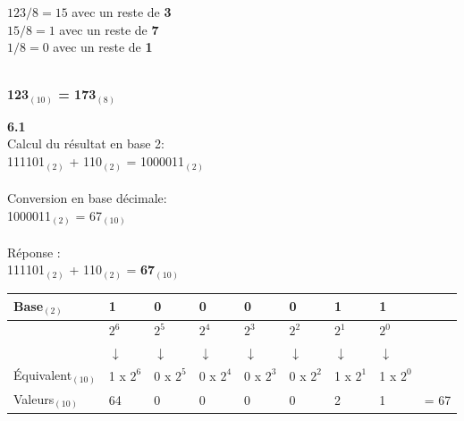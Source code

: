 \begin{Exercice}[20 minutes]
\begin{conseil}
        $123 / 8 = 15$ avec un reste de \textbf{3}\\
        $15 / 8 = 1$ avec un reste de \textbf{7}\\
        $1 / 8 = 0$ avec un reste de \textbf{1}\\\
        
        \textbf{123$_{(10)}$ = 173$_{(8)}$}\\
        
    \end{conseil}
    \begin{solution} \textbf{6.1}\\
        Calcul du résultat en base 2:\\
        111101$_{(2)}$ + 110$_{(2)}$ = 1000011$_{(2)}$\\\\
        Conversion en base décimale:\\
        1000011$_{(2)}$ = 67$_{(10)}$\\\\
        Réponse :\\
        111101$_{(2)}$ + 110$_{(2)}$ = \textbf{67$_{(10)}$}\\
        
        \begin{tabular}{| C{0.15\textwidth} | C{0.07\textwidth} | C{0.07\textwidth} | C{0.07\textwidth} | C{0.07\textwidth} | C{0.07\textwidth} | C{0.07\textwidth} | C{0.07\textwidth} | C{0.06\textwidth} |} 
            \hline
            Base$_{(2)}$ & \textbf{1} & \textbf{0} & \textbf{0} & \textbf{0} & \textbf{0} & \textbf{1} & \textbf{1} & \textbf{}\\ [0.5ex]
            \hline
             & $2^6$ & $2^5$ & $2^4$ & $2^3$ & $2^2$ & $2^1$ & $2^0$ & \\ [0.5ex] 
            \hline
             & $\downarrow$ & $\downarrow$ & $\downarrow$ & $\downarrow$ & $\downarrow$ & $\downarrow$ & $\downarrow$ & \\ [0.5ex] 
            \hline
            Équivalent$_{(10)}$ & 1 x $2^6$ & 0 x $2^5$ & 0 x $2^4$ & 0 x $2^3$ & 0 x $2^2$ & 1 x $2^1$ & 1 x $2^0$ & \\ [0.5ex]     
            \hline
            Valeurs$_{(10)}$ & 64 & 0 & 0 & 0 & 0 & 2 & 1 & = 67 \\ [0.5ex]
            \hline
        \end{tabular}
        

\end{solution}
\end{Exercice}
